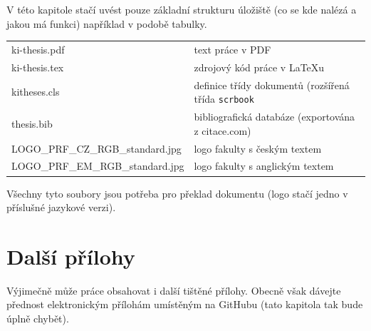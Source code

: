 \documentclass[male,czech,api_bc]{kitheses}
\begin{document}
V této kapitole stačí uvést pouze základní strukturu úložiště (co se kde nalézá a jakou má funkci) například v podobě tabulky. 

\begin{longtable}{ll}
\hline
ki-thesis.pdf & text práce v PDF \\
ki-thesis.tex & zdrojový kód práce v \LaTeX{}u \\
kitheses.cls & definice třídy dokumentů (rozšířená třída \texttt{scrbook} \\
thesis.bib & bibliografická databáze (exportována z citace.com) \\
LOGO\_PRF\_CZ\_RGB\_standard.jpg  & logo fakulty s českým textem \\
LOGO\_PRF\_EM\_RGB\_standard.jpg  & logo fakulty s anglickým textem  \\
\hline
\end{longtable}

Všechny tyto soubory jsou potřeba pro překlad dokumentu (logo stačí jedno v příslušné jazykové verzi).

\chapter{Další přílohy}

Výjimečně může práce obsahovat i další tištěné přílohy. Obecně však dávejte přednost elektronickým přílohám umístěným na GitHubu (tato kapitola tak bude úplně chybět). 
\end{document}
